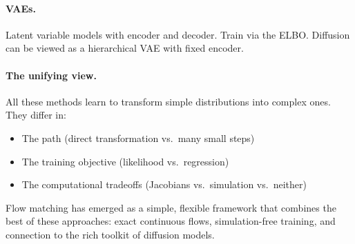 \documentclass[11pt]{article}
\begin{document}
\paragraph{VAEs.} Latent variable models with encoder and decoder. Train via the ELBO. Diffusion can be viewed as a hierarchical VAE with fixed encoder.

\paragraph{The unifying view.} All these methods learn to transform simple distributions into complex ones. They differ in:
\begin{itemize}
\item The path (direct transformation vs.\ many small steps)
\item The training objective (likelihood vs.\ regression)
\item The computational tradeoffs (Jacobians vs.\ simulation vs.\ neither)
\end{itemize}

Flow matching has emerged as a simple, flexible framework that combines the best of these approaches: exact continuous flows, simulation-free training, and connection to the rich toolkit of diffusion models.


\end{document}
